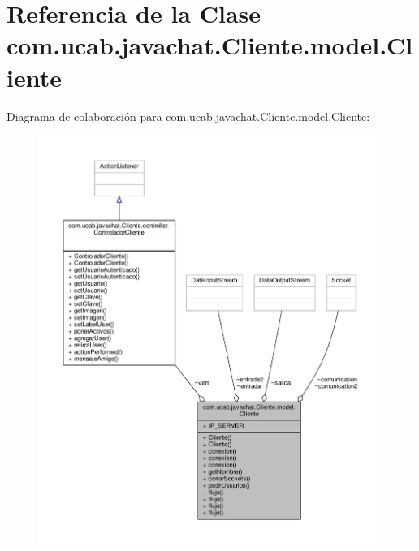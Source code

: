 \hypertarget{classcom_1_1ucab_1_1javachat_1_1_cliente_1_1model_1_1_cliente}{\section{Referencia de la Clase com.\-ucab.\-javachat.\-Cliente.\-model.\-Cliente}
\label{classcom_1_1ucab_1_1javachat_1_1_cliente_1_1model_1_1_cliente}
}


Diagrama de colaboración para com.\-ucab.\-javachat.\-Cliente.\-model.\-Cliente\-:\nopagebreak
\begin{figure}[H]
\begin{center}
\leavevmode
\includegraphics[width=350pt]{classcom_1_1ucab_1_1javachat_1_1_cliente_1_1model_1_1_cliente__coll__graph}
\end{center}
\end{figure}
